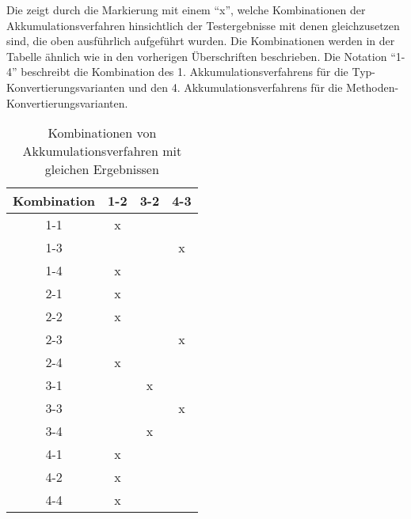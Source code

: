 \begin{multicols}{3}
\columnbreak
{}\columnbreak
{}
\end{multicols}
\noindent
Die  zeigt durch die Markierung mit einem ``x'', welche Kombinationen der Akkumulationsverfahren hinsichtlich der Testergebnisse mit denen gleichzusetzen sind, die oben ausführlich aufgeführt wurden. Die Kombinationen werden in der Tabelle ähnlich wie in den vorherigen Überschriften beschrieben. Die Notation ``1-4'' beschreibt die Kombination des 1. Akkumulationsverfahrens für die Typ-Konvertierungsvarianten und den 4. Akkumulationsverfahrens für die Methoden-Konvertierungsvarianten.
\begin{table}[H]
\centering
\begin{tabular}[c]{|c|c|c|c|}
\hline\hline
\textbf{Kombination} & \textbf{1-2} & \textbf{3-2} & \textbf{4-3} \\
\hline
1-1 & x& & \\
\hline
1-3 & & & x\\
\hline
1-4 & x& & \\
\hline
2-1 & x& & \\
\hline
2-2 & x& & \\
\hline
2-3 & & &x \\
\hline
2-4 & x& & \\
\hline
3-1 & &x & \\
\hline
3-3 & & & x\\
\hline
3-4 & &x & \\
\hline
4-1 & x& & \\
\hline
4-2 & x& & \\
\hline
4-4 & x& & \\
\hline\hline
\end{tabular}
\caption{Kombinationen von Akkumulationsverfahren mit gleichen Ergebnissen}
\label{tab:akkuverfahren}
\end{table}


